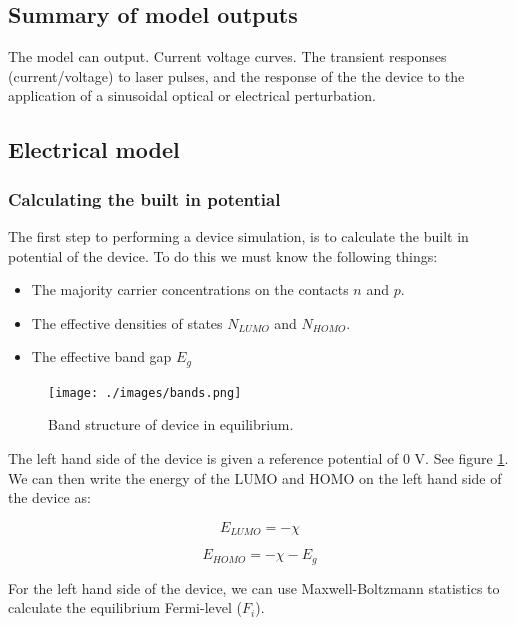 \documentclass[11pt]{article}
\begin{document}
\subsection{Summary of model outputs}
The model can output.  Current voltage curves.  The transient responses (current/voltage) to laser pulses, and the response of the the device to the application of a sinusoidal optical or electrical perturbation. 

\subsection{Electrical model}
\subsubsection{Calculating the built in potential}  \label{sssec:initial}
The first step to performing a device simulation, is to calculate the built in potential of the device.  To do this we must know the following things:

\begin{itemize}

  \item The majority carrier concentrations on the contacts $n$ and $p$.
  \item The effective densities of states $N_{LUMO}$ and $N_{HOMO}$.
  \item The effective band gap $E_g$

\end{itemize}

\begin{figure}[ht!]
\centering
\texttt{[image: ./images/bands.png]}
\caption{Band structure of device in equilibrium.}
\label{fig:bands}
\end{figure}

\vspace{1em}
The left hand side of the device is given a reference potential of 0 V.  See figure \ref{fig:bands}.  We can then write the energy of the LUMO and HOMO on the left hand side of the device as:

\begin{equation}
E_{LUMO}=-\chi
\end{equation}

\begin{equation}
E_{HOMO}=-\chi-E_{g}
\end{equation}

For the left hand side of the device, we can use Maxwell-Boltzmann statistics to calculate the equilibrium Fermi-level ($F_i$).
\end{document}

